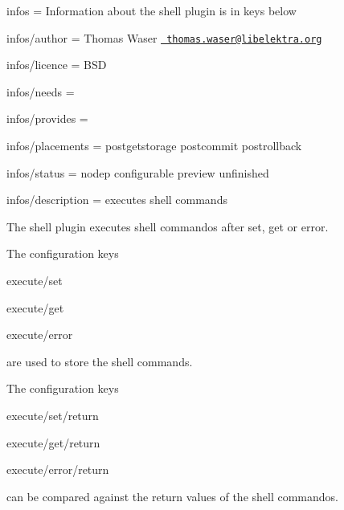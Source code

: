 
\begin{DoxyItemize}
\item infos = Information about the shell plugin is in keys below
\item infos/author = Thomas Waser \href{mailto:thomas.waser@libelektra.org}{\texttt{ thomas.\+waser@libelektra.\+org}}
\item infos/licence = B\+SD
\item infos/needs =
\item infos/provides =
\item infos/placements = postgetstorage postcommit postrollback
\item infos/status = nodep configurable preview unfinished
\item infos/description = executes shell commands
\end{DoxyItemize}

The shell plugin executes shell commandos after set, get or error.

The configuration keys


\begin{DoxyItemize}
\item {\ttfamily execute/set}
\item {\ttfamily execute/get}
\item {\ttfamily execute/error}
\end{DoxyItemize}

are used to store the shell commands.

The configuration keys


\begin{DoxyItemize}
\item {\ttfamily execute/set/return}
\item {\ttfamily execute/get/return}
\item {\ttfamily execute/error/return}
\end{DoxyItemize}

can be compared against the return values of the shell commandos.


\begin{DoxyCode}{0}
\DoxyCodeLine{}
\DoxyCodeLine{}
\DoxyCodeLine{\#>}
\DoxyCodeLine{}
\DoxyCodeLine{}
\DoxyCodeLine{}
\end{DoxyCode}
 